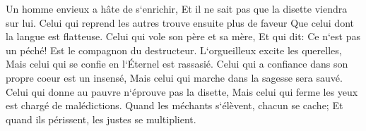\verse Un homme envieux a hâte de s`enrichir, Et il ne sait pas que la disette viendra sur lui. 
\verse Celui qui reprend les autres trouve ensuite plus de faveur Que celui dont la langue est flatteuse. 
\verse Celui qui vole son père et sa mère, Et qui dit: Ce n`est pas un péché! Est le compagnon du destructeur. 
\verse L`orgueilleux excite les querelles, Mais celui qui se confie en l`Éternel est rassasié. 
\verse Celui qui a confiance dans son propre coeur est un insensé, Mais celui qui marche dans la sagesse sera sauvé. 
\verse Celui qui donne au pauvre n`éprouve pas la disette, Mais celui qui ferme les yeux est chargé de malédictions. 
\verse Quand les méchants s`élèvent, chacun se cache; Et quand ils périssent, les justes se multiplient. 

\chapter{}


